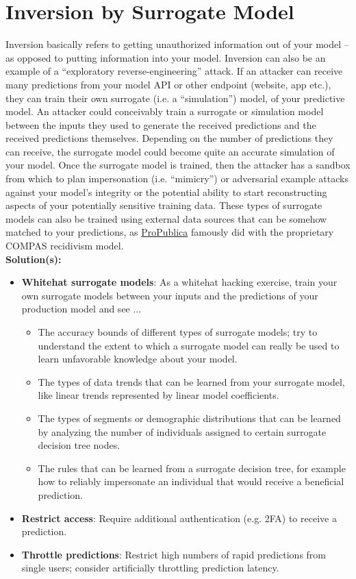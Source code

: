 \documentclass[fleqn]{article}
\begin{document}
\section{Inversion by Surrogate Model}

Inversion basically refers to getting unauthorized information out of your model -- as opposed to putting information into your model. Inversion can also be an example of a ``exploratory reverse-engineering'' attack. If an attacker can receive many predictions from your model API or other endpoint (website, app etc.), they can train their own surrogate (i.e. a ``simulation'') model, of your predictive model. An attacker could conceivably train a surrogate or simulation model between the inputs they used to generate the received predictions and the received predictions themselves. Depending on the number of predictions they can receive, the surrogate model could become quite an accurate simulation of your model. Once the surrogate model is trained, then the attacker has a sandbox from which to plan impersonation (i.e. ``mimicry'') or adversarial example attacks against your model's integrity or the potential ability to start reconstructing aspects of your potentially sensitive training data. These types of surrogate models can also be trained using external data sources that can be somehow matched to your predictions, as \href{https://www.propublica.org/article/machine-bias-risk-assessments-in-criminal-sentencing}{ProPublica} famously did with the proprietary COMPAS recidivism model.\\

\noindent\textbf{Solution(s):}
\begin{itemize}
\item \textbf{Whitehat surrogate models}: As a whitehat hacking exercise, train your own surrogate models between your inputs and the predictions of your production model and see ...
	\begin{itemize}
	\item The accuracy bounds of different types of surrogate models; try to understand the extent to which a surrogate model can really be used to learn unfavorable knowledge about your model. 
	\item The types of data trends that can be learned from your surrogate model, like linear trends represented by linear model coefficients.
	\item The types of segments or demographic distributions that can be learned by analyzing the number of individuals assigned to certain surrogate decision tree nodes.
	\item The rules that can be learned from a surrogate decision tree, for example how to reliably impersonate an individual that would receive a beneficial prediction. 
	\end{itemize}
\item \textbf{Restrict access}: Require additional authentication (e.g. 2FA) to receive a prediction.
\item \textbf{Throttle predictions}: Restrict high numbers of rapid predictions from single users; consider artificially throttling prediction latency.
\end{itemize}
\end{document}
